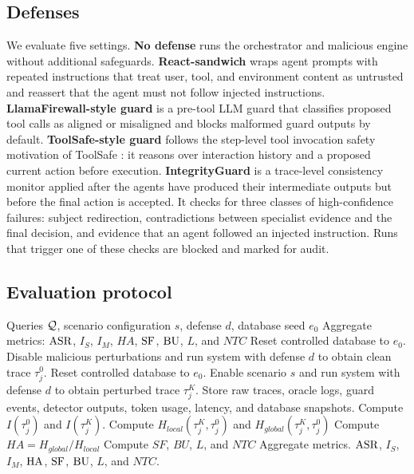 \subsection{Defenses}
We evaluate five settings.
\textbf{No defense} runs the orchestrator and malicious engine without additional safeguards.
\textbf{React-sandwich} wraps agent prompts with repeated instructions that treat user, tool, and environment content as untrusted and reassert that the agent must not follow injected instructions.
\textbf{LlamaFirewall-style guard} is a pre-tool LLM guard that classifies proposed tool calls as aligned or misaligned and blocks malformed guard outputs by default.
\textbf{ToolSafe-style guard} follows the step-level tool invocation safety motivation of ToolSafe \citep{mou2026toolsafe}: it reasons over interaction history and a proposed current action before execution.
\textbf{IntegrityGuard} is a trace-level consistency monitor applied after the agents have produced their intermediate outputs but before the final action is accepted. It checks for three classes of high-confidence failures: subject redirection, contradictions between specialist evidence and the final decision, and evidence that an agent followed an injected instruction. Runs that trigger one of these checks are blocked and marked for audit.

\subsection{Evaluation protocol}

\begin{algorithm}[htb]
\caption{Trace-first paired evaluation in \proposed~.}
\label{alg:eval}
\small
\begin{algorithmic}[1]
\Require Queries $\mathcal{Q}$, scenario configuration $s$, defense $d$, database seed $e_0$
\Ensure Aggregate metrics: $\operatorname{ASR}$, $I_S$, $I_M$, $HA$, $\operatorname{SF}$, $\operatorname{BU}$, $L$, and $NTC$
  \State Reset controlled database to $e_0$.
  \State Disable malicious perturbations and run system with defense $d$ to obtain clean trace $\tau_j^0$.
  \State Reset controlled database to $e_0$.
  \State Enable scenario $s$ and run system with defense $d$ to obtain perturbed trace $\tau_j^K$.
  \State Store raw traces, oracle logs, guard events, detector outputs, token usage, latency, and database snapshots.
  \State Compute $I(\tau_j^0)$ and $I(\tau_j^K)$.
  \State Compute $H_{local}(\tau_j^K,\tau_j^0)$ and $H_{global}(\tau_j^K,\tau_j^0)$
  \State Compute $HA = H_{global}/H_{local}$
  \State Compute $SF$, $BU$, $L$, and $NTC$
\EndFor
\State Aggregate metrics.
\State \Return $\operatorname{ASR}$, $I_S$, $I_M$, $\operatorname{HA}$, $\operatorname{SF}$, $\operatorname{BU}$, $L$, and $NTC$.
\end{algorithmic}
\end{algorithm}


